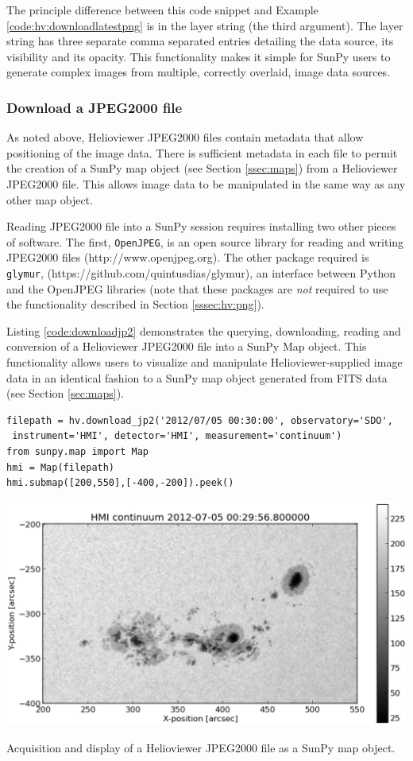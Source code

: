 The principle difference between this code snippet and Example
\ref{code:hv:downloadlatestpng} is in the layer string (the third
argument).  The layer string has three separate comma separated
entries detailing the data source, its visibility and its opacity.
This functionality makes it simple for SunPy users to generate complex
images from multiple, correctly overlaid, image data sources.


\subsubsection{Download a JPEG2000 file}\label{sssec:hv:jp}

As noted above, Helioviewer JPEG2000 files contain metadata that allow
positioning of the image data.  There is sufficient metadata in each
file to permit the creation of a SunPy map object (see Section
\ref{ssec:maps}) from a Helioviewer JPEG2000 file.  This allows image
data to be manipulated in the same way as any other map object.

Reading JPEG2000 file into a SunPy session requires installing two
other pieces of software. The first, \texttt{OpenJPEG}, is an open
source library for reading and writing JPEG2000 files
(http://www.openjpeg.org).  The other package required is
\texttt{glymur}, (https://github.com/quintusdias/glymur), an interface
between Python and the OpenJPEG libraries (note that these packages
are {\it not} required to use the functionality described in Section
\ref{sssec:hv:png}).

Listing \ref{code:downloadjp2} demonstrates the querying, downloading,
reading and conversion of a Helioviewer JPEG2000 file into a SunPy Map
object.  This functionality allows users to visualize and manipulate
Helioviewer-supplied image data in an identical fashion to a SunPy map
object generated from FITS data (see Section \ref{sec:maps}).

\begin{listing}[H]
\begin{verbatim}
filepath = hv.download_jp2('2012/07/05 00:30:00', observatory='SDO',
 instrument='HMI', detector='HMI', measurement='continuum')
from sunpy.map import Map
hmi = Map(filepath)
hmi.submap([200,550],[-400,-200]).peek()
\end{verbatim}
\includegraphics[width=0.8\columnwidth]{helioviewer_hmi_continuum_jp2_to_map}
\caption{Acquisition and display of a Helioviewer JPEG2000 file as a
  SunPy map object.}
\label{code:downloadjp2}
\end{listing}